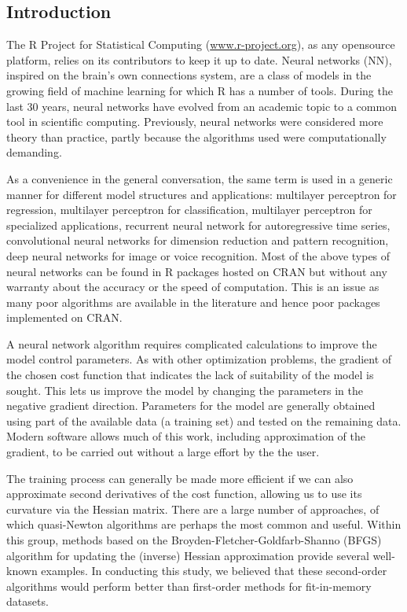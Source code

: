 \hypertarget{introduction}{%
\subsection{Introduction}\label{introduction}}

The R Project for Statistical Computing (\url{www.r-project.org}), as
any opensource platform, relies on its contributors to keep it up to
date. Neural networks (NN), inspired on the brain's own connections
system, are a class of models in the growing field of machine learning
for which R has a number of tools. During the last 30 years, neural
networks have evolved from an academic topic to a common tool in
scientific computing. Previously, neural networks were considered more
theory than practice, partly because the algorithms used were
computationally demanding.

As a convenience in the general conversation, the same term is used in a
generic manner for different model structures and applications:
multilayer perceptron for regression, multilayer perceptron for
classification, multilayer perceptron for specialized applications,
recurrent neural network for autoregressive time series, convolutional
neural networks for dimension reduction and pattern recognition, deep
neural networks for image or voice recognition. Most of the above types
of neural networks can be found in R packages hosted on CRAN but without
any warranty about the accuracy or the speed of computation. This is an
issue as many poor algorithms are available in the literature and hence
poor packages implemented on CRAN.

A neural network algorithm requires complicated calculations to improve
the model control parameters. As with other optimization problems, the
gradient of the chosen cost function that indicates the lack of
suitability of the model is sought. This lets us improve the model by
changing the parameters in the negative gradient direction. Parameters
for the model are generally obtained using part of the available data (a
training set) and tested on the remaining data. Modern software allows
much of this work, including approximation of the gradient, to be
carried out without a large effort by the the user.

The training process can generally be made more efficient if we can also
approximate second derivatives of the cost function, allowing us to use
its curvature via the Hessian matrix. There are a large number of
approaches, of which quasi-Newton algorithms are perhaps the most common
and useful. Within this group, methods based on the
Broyden-Fletcher-Goldfarb-Shanno (BFGS) algorithm for updating the
(inverse) Hessian approximation provide several well-known examples. In
conducting this study, we believed that these second-order algorithms
would perform better than first-order methods for fit-in-memory
datasets.

